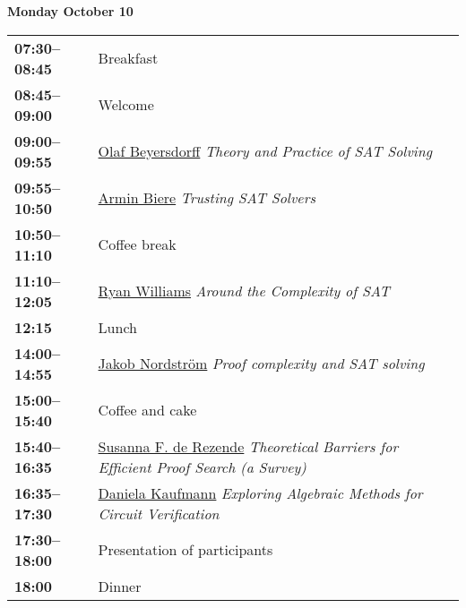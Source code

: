 \documentclass[11pt]{article}
\newcommand{\scheduletablewidth}{5.06in}
\begin{document}
\noindent\begin{minipage}{\textwidth}
\begin{center}
{\bf\large Monday October 10}
\end{center}
\begin{tabular}{ p{0.9in} p{\scheduletablewidth} }
{\bf 07:30--08:45}  & Breakfast\\
{\bf 08:45--09:00}  &
                    Welcome
\\

{\bf 09:00--09:55} & \hyperref[Beyersdorff]{Olaf Beyersdorff}
{\em Theory and Practice of SAT Solving} \\

{\bf 09:55--10:50} & \hyperref[Biere]{Armin Biere}
{\em Trusting SAT Solvers} \\


{\bf 10:50--11:10} & Coffee break \\


{\bf 11:10--12:05} & \hyperref[Williams]{Ryan Williams}
{\em Around the Complexity of SAT} \\

{\bf 12:15%
} &  Lunch\\

{\bf 14:00--14:55} & \hyperref[Nordstrom]{Jakob Nordström}
{\em Proof complexity and SAT solving} \\

{\bf 15:00--15:40} &  Coffee and cake \\

{\bf 15:40--16:35} & \hyperref[Rezende]{Susanna F. de Rezende}
{\em Theoretical Barriers for Efficient Proof Search (a Survey)} \\

{\bf 16:35--17:30} & \hyperref[Kaufmann]{Daniela Kaufmann}
{\em Exploring Algebraic Methods for Circuit Verification} \\

{\bf 17:30--18:00} & Presentation of participants \\

{\bf 18:00%
} & Dinner \\
\end{tabular}
\end{minipage}
\end{document}
